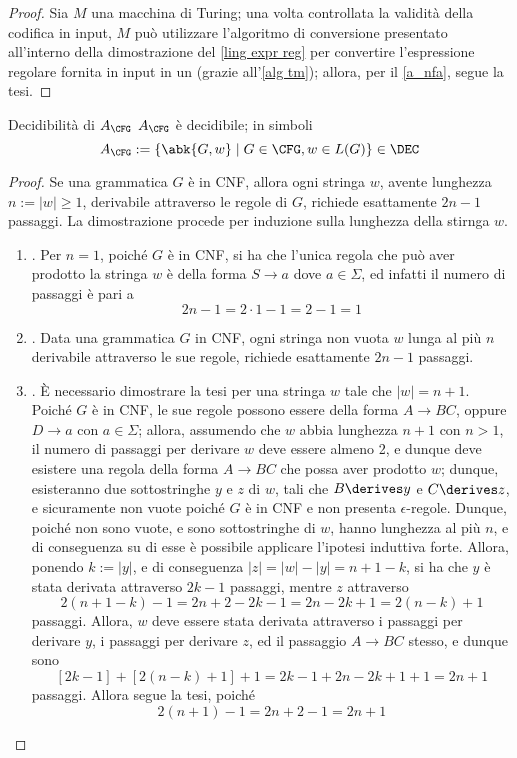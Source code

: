 \documentclass[a4paper, 12pt]{report}
\begin{document}
    \begin{proof}
        Sia $M$ una macchina di Turing; una volta controllata la validità della codifica in input, $M$ può utilizzare l'algoritmo di conversione presentato all'interno della dimostrazione del \cref{ling expr reg} per convertire l'espressione regolare fornita in input in un \NFA (grazie all'\cref{alg tm}); allora, per il \cref{a_nfa}, segue la tesi.
    \end{proof}

    \begin{framedthm}[label={a_cfg in dec}]{Decidibilità di $A_\CFG$}
        $A_\CFG$ è decidibile; in simboli $$A_\CFG := \{\abk{G, w} \mid G \in \CFG, w \in L(G)\} \in \DEC$$
    \end{framedthm}

    \begin{proof}
        Se una grammatica $G$ è in CNF, allora ogni stringa $w$, avente lunghezza $n := |w| \ge 1$, derivabile attraverso le regole di $G$, richiede esattamente $2n - 1$ passaggi. La dimostrazione procede per induzione sulla lunghezza della stirnga $w$.

        \begin{enumerate}[label=]
            \item {}. Per $n = 1$, poiché $G$ è in CNF, si ha che l'unica regola che può aver prodotto la stringa $w$ è della forma $S \to a$ dove $a \in \Sigma$, ed infatti il numero di passaggi è pari a $$2n - 1 = 2 \cdot 1 -1 = 2 - 1 = 1$$
            \item {}. Data una grammatica $G$ in CNF, ogni stringa non vuota $w$ lunga al più $n$ derivabile attraverso le sue regole, richiede esattamente $2n-1$ passaggi.
            \item {}. È necessario dimostrare la tesi per una stringa $w$ tale che $|w| = n + 1$. Poiché $G$ è in CNF, le sue regole possono essere della forma $A \to BC$, oppure $D \to a$ con $a \in \Sigma$; allora, assumendo che $w$ abbia lunghezza $n + 1$ con $n > 1$, il numero di passaggi per derivare $w$ deve essere almeno 2, e dunque deve esistere una regola della forma $A \to BC$ che possa aver prodotto $w$; dunque, esisteranno due sottostringhe $y$ e $z$ di $w$, tali che $B \derives y$ e $C \derives z$, e sicuramente non vuote poiché $G$ è in CNF e non presenta $\epsilon$-regole. Dunque, poiché non sono vuote, e sono sottostringhe di $w$, hanno lunghezza al più $n$, e di conseguenza su di esse è possibile applicare l'ipotesi induttiva forte. Allora, ponendo $k := |y|$, e di conseguenza $|z| = |w| - |y| = n + 1 - k$, si ha che $y$ è stata derivata attraverso $2k - 1$ passaggi, mentre $z$ attraverso $$2(n+ 1 - k) - 1 = 2n+2-2k -1 = 2n-2k+1 = 2(n -k) + 1$$ passaggi. Allora, $w$ deve essere stata derivata attraverso i passaggi per derivare $y$, i passaggi per derivare $z$, ed il passaggio $A \to BC$ stesso, e dunque sono $$[2k - 1] + [2(n - k) + 1 ] + 1= 2k -1 +2n -2k +1 + 1 = 2n + 1$$ passaggi. Allora segue la tesi, poiché $$2(n + 1) - 1= 2n + 2 - 1 = 2n +1$$
        \end{enumerate}


\end{proof}
\end{document}
